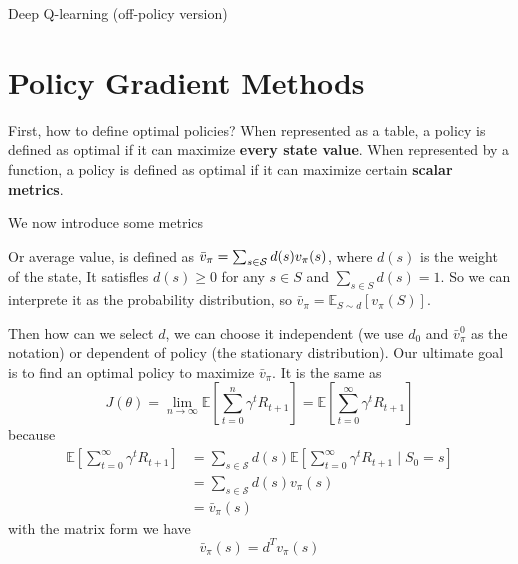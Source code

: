 \documentclass[10pt]{elegantbook}
\begin{document}
\vspace{\baselineskip}

\begin{algorithm}[H]
\caption{Deep Q-learning (off-policy version)}

\end{algorithm}

\vspace{\baselineskip}


\section{Policy Gradient Methods}
First, how to define optimal policies? When represented as a table, a policy is defined
as optimal if it can maximize \textbf{every state value}. When represented by a function, a
policy is defined as optimal if it can maximize certain \textbf{scalar metrics}.

We now introduce some metrics
\begin{definition}
    Or average value, is defined as $\bar{v}_{\pi}=\sum_{s\in{\cal S}}d(s)v_{\pi}(s)$, where $d(s)$ is the weight
    of the state, It satisfles $d(s)\geq0$ for any $s\in S$ and $\sum_{s\in S}d(s)=1$. So we can interprete it as the probability distribution, so 
    $\bar{v}_{\pi}=\mathbb{E}_{S\sim d}[v_{\pi}(S)]$.

    Then how can we select $d$, we can choose it independent (we use $d_0$ and $\bar v_{\pi}^0$ as the notation) or dependent of policy (the stationary 
    distribution). Our ultimate goal is to find an optimal policy to maximize $\bar{v}_{\pi}$. It is the same as 
    \[ J(\theta)=\lim_{n\rightarrow\infty}\mathbb{E}\left[\sum_{t=0}^{n}\gamma^{t}R_{t+1}\right]=\mathbb{E}\left[\sum_{t=0}^{\infty}\gamma^{t}R_{t+1}\right] \]
    because
    \begin{align*}
        \mathbb{E}\left[\sum_{t=0}^{\infty}\gamma^{t}R_{t+1}\right] &= \sum_{s \in \mathcal S}d(s) \mathbb{E}\left[\sum_{t=0}^{\infty}\gamma^{t}R_{t+1} \mid S_0 = s \right] \\
        &= \sum_{s \in \mathcal S}d(s) v_{\pi}(s) \\
        &= \bar v_{\pi}(s)
    \end{align*}
    with the matrix form we have
    \[ \bar v_{\pi}(s) = d^T v_{\pi}(s) \]
\end{definition}
\end{document}
